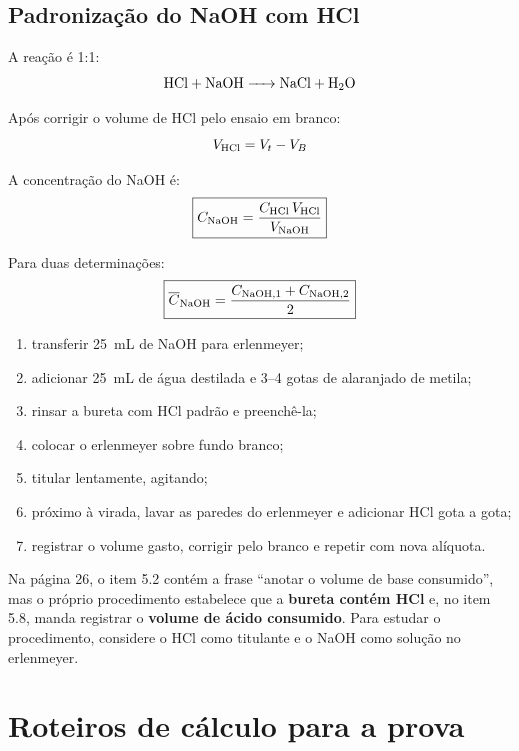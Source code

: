 \documentclass[a4paper,12pt]{article}
\begin{document}
\subsection{Padronização do NaOH com HCl}

A reação é 1:1:
\[
\ce{HCl + NaOH -> NaCl + H2O}
\]

\begin{conta}
Após corrigir o volume de HCl pelo ensaio em branco:
\[
V_{\ce{HCl}}=V_t-V_B
\]

A concentração do NaOH é:
\[
\boxed{C_{\ce{NaOH}}=\frac{C_{\ce{HCl}}\,V_{\ce{HCl}}}{V_{\ce{NaOH}}}}
\]

Para duas determinações:
\[
\boxed{\overline{C}_{\ce{NaOH}}=\frac{C_{\ce{NaOH},1}+C_{\ce{NaOH},2}}{2}}
\]
\end{conta}

\begin{procedimento}
\begin{enumerate}[leftmargin=1.7em]
    \item transferir \SI{25}{\milli\liter} de NaOH para erlenmeyer;
    \item adicionar \SI{25}{\milli\liter} de água destilada e 3--4 gotas de alaranjado de metila;
    \item rinsar a bureta com HCl padrão e preenchê-la;
    \item colocar o erlenmeyer sobre fundo branco;
    \item titular lentamente, agitando;
    \item próximo à virada, lavar as paredes do erlenmeyer e adicionar HCl gota a gota;
    \item registrar o volume gasto, corrigir pelo branco e repetir com nova alíquota.
\end{enumerate}
\end{procedimento}

\begin{atencao}
Na página 26, o item 5.2 contém a frase ``anotar o volume de base consumido'', mas o próprio procedimento estabelece que a \textbf{bureta contém HCl} e, no item 5.8, manda registrar o \textbf{volume de ácido consumido}. Para estudar o procedimento, considere o HCl como titulante e o NaOH como solução no erlenmeyer.
\end{atencao}

\section{Roteiros de cálculo para a prova}
\end{document}
